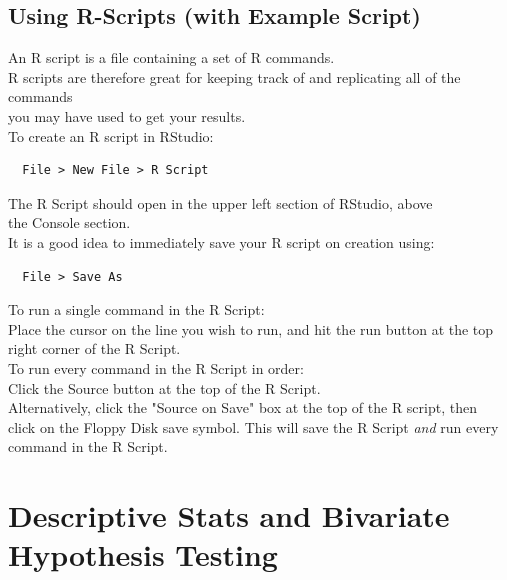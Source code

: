 \documentclass[12pt,letterpaper]{article}
\newcommand{\ind}{\phantom{AA}}
\begin{document}
\subsection{Using R-Scripts (with Example Script)}
\normalsize
\begin{tcolorbox}[title = R Scripts]

An R script is a file containing a set of R commands.\vspace{.5em}\\
R scripts are therefore great for keeping track of and replicating all of the commands\\ \ind you may have used to get your results. \vspace{.5em}\\ 
To create an R script in RStudio:
\begin{lstlisting}
  File > New File > R Script
\end{lstlisting}
The R Script should open in the upper left section of RStudio, above\\ \ind the Console section.\vspace{.5em}\\
It is a good idea to immediately save your R script on creation using:
\begin{lstlisting}
  File > Save As
\end{lstlisting}
To run a single command in the R Script: \\
\ind Place the cursor on the line you wish to run, and hit the run button at the top\\ \ind right corner of the R Script.\vspace{.5em} \\
To run every command in the R Script in order: \\ 
\ind Click the Source button at the top of the R Script.\vspace{.5em}\\
\ind Alternatively, click the "Source on Save" box at the top of the R script, then\\ \ind click on the Floppy Disk save symbol. This will save the R Script \textit{and} run every\\ \ind command in the R Script.
\end{tcolorbox}


\normalsize 


\section{Descriptive Stats and Bivariate Hypothesis Testing}
\end{document}

